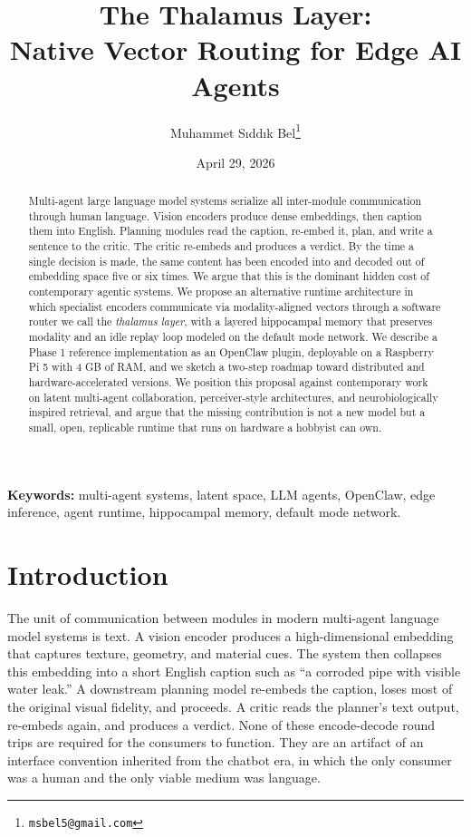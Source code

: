 \documentclass[11pt]{article}
\title{\Large\bfseries The Thalamus Layer:\\
Native Vector Routing for Edge AI Agents}
\author[1]{Muhammet Sıddık Bel\thanks{\texttt{msbel5@gmail.com}}}
\affil[1]{Independent. Diyarbakır, Turkey. \url{https://msbel.com}}
\date{April 29, 2026}
\begin{document}
\maketitle

\begin{abstract}
\noindent
Multi-agent large language model systems serialize all inter-module
communication through human language. Vision encoders produce dense
embeddings, then caption them into English. Planning modules read the
caption, re-embed it, plan, and write a sentence to the critic. The
critic re-embeds and produces a verdict. By the time a single decision
is made, the same content has been encoded into and decoded out of
embedding space five or six times. We argue that this is the dominant
hidden cost of contemporary agentic systems. We propose an alternative
runtime architecture in which specialist encoders communicate via
modality-aligned vectors through a software router we call the
\emph{thalamus layer}, with a layered hippocampal memory that preserves
modality and an idle replay loop modeled on the default mode network.
We describe a Phase 1 reference implementation as an OpenClaw plugin,
deployable on a Raspberry Pi 5 with 4 GB of RAM, and we sketch a
two-step roadmap toward distributed and hardware-accelerated versions.
We position this proposal against contemporary work on latent
multi-agent collaboration, perceiver-style architectures, and
neurobiologically inspired retrieval, and argue that the missing
contribution is not a new model but a small, open, replicable runtime
that runs on hardware a hobbyist can own.
\end{abstract}

\noindent\textbf{Keywords:} multi-agent systems, latent space,
LLM agents, OpenClaw, edge inference, agent runtime, hippocampal
memory, default mode network.

\section{Introduction}

The unit of communication between modules in modern multi-agent
language model systems is text. A vision encoder produces a
high-dimensional embedding that captures texture, geometry, and
material cues. The system then collapses this embedding into a
short English caption such as ``a corroded pipe with visible
water leak.'' A downstream planning model re-embeds the caption,
loses most of the original visual fidelity, and proceeds. A
critic reads the planner's text output, re-embeds again, and
produces a verdict. None of these encode-decode round trips are
required for the consumers to function. They are an artifact of
an interface convention inherited from the chatbot era, in which
the only consumer was a human and the only viable medium was
language.
\end{document}
